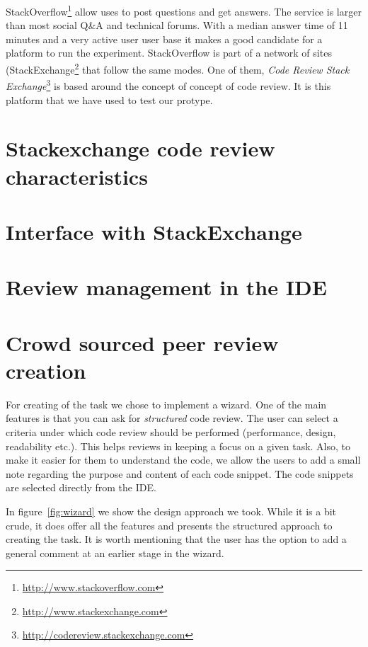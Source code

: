 \documentclass{sigchi}
\begin{document}
StackOverflow\footnote{\url{http://www.stackoverflow.com}} allow uses to post questions and get
answers. The service is larger than most social Q\&A and technical forums. With a median answer time 
of 11 minutes and a very active user user base \cite{Mamykina2011} it makes a good candidate for a
platform to run the experiment. StackOverflow is part of a network of sites (StackExchange\footnote{\url{http://www.stackexchange.com}} that follow the same modes. One of them, \emph{Code
Review Stack Exchange}\footnote{\url{http://codereview.stackexchange.com}} is based around the
concept of concept of code review. It is this platform that we have used to test our protype.

\section{Stackexchange code review characteristics}
\section{Interface with StackExchange}
\section{Review management in the IDE}

\section{Crowd sourced peer review creation}

For creating of the task we chose to implement a wizard. One of the main features is that you can ask
for \emph{structured} code review. The user can select a criteria under which code review should be
performed (performance, design, readability etc.). This helps reviews in keeping a focus on a given task.
Also, to make it easier for them to understand the code, we allow the users to add a small note regarding
the purpose and content of each code snippet. The code snippets are selected directly from the IDE.

In figure~\ref{fig:wizard} we show the design approach we took. While it is a bit crude, it does offer all
the features and presents the structured approach to creating the task. It is worth mentioning that the user
has the option to add a general comment at an earlier stage in the wizard.
\end{document}
